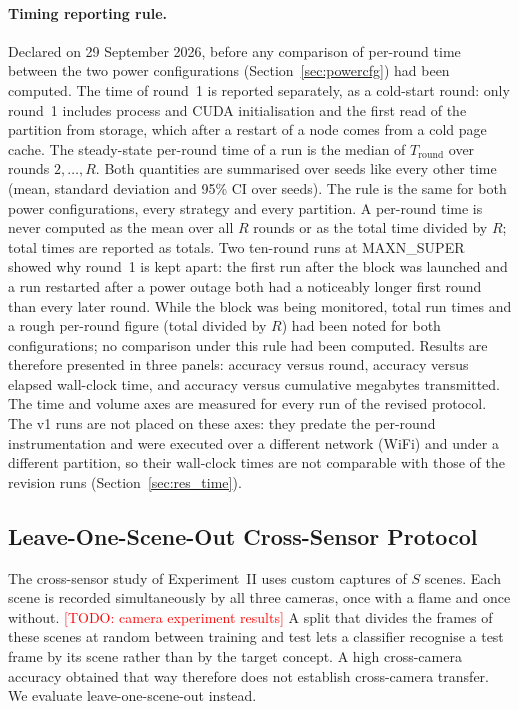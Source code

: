 \documentclass[journal]{IEEEtran}
\newcommand{\todo}[1]{\textcolor{red}{[TODO: #1]}}
\begin{document}
\paragraph{Timing reporting rule.} Declared on 29 September 2026, before any comparison of per-round time between the two power configurations (Section~\ref{sec:powercfg}) had been computed. The time of round~1 is reported separately, as a cold-start round: only round~1 includes process and CUDA initialisation and the first read of the partition from storage, which after a restart of a node comes from a cold page cache. The steady-state per-round time of a run is the median of $T_{\mathrm{round}}$ over rounds $2,\dots,R$. Both quantities are summarised over seeds like every other time (mean, standard deviation and 95\% CI over seeds). The rule is the same for both power configurations, every strategy and every partition. A per-round time is never computed as the mean over all $R$ rounds or as the total time divided by $R$; total times are reported as totals. Two ten-round runs at MAXN\_SUPER showed why round~1 is kept apart: the first run after the block was launched and a run restarted after a power outage both had a noticeably longer first round than every later round. While the block was being monitored, total run times and a rough per-round figure (total divided by $R$) had been noted for both configurations; no comparison under this rule had been computed. Results are therefore presented in three panels: accuracy versus round, accuracy versus elapsed wall-clock time, and accuracy versus cumulative megabytes transmitted. The time and volume axes are measured for every run of the revised protocol. The v1 runs are not placed on these axes: they predate the per-round instrumentation and were executed over a different network (WiFi) and under a different partition, so their wall-clock times are not comparable with those of the revision runs (Section~\ref{sec:res_time}).

\subsection{Leave-One-Scene-Out Cross-Sensor Protocol}
\label{sec:loso}

The cross-sensor study of Experiment~II uses custom captures of $S$ scenes. Each scene is recorded simultaneously by all three cameras, once with a flame and once without. \todo{camera experiment results} A split that divides the frames of these scenes at random between training and test lets a classifier recognise a test frame by its scene rather than by the target concept. A high cross-camera accuracy obtained that way therefore does not establish cross-camera transfer. We evaluate leave-one-scene-out instead.
\end{document}
